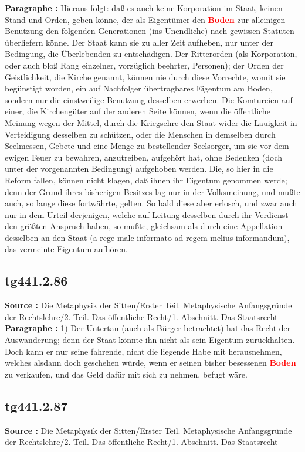 \documentclass[a4paper,12pt,twoside]{book}
\newcommand{\match}[1]{\textcolor{red}{\textbf{#1}}}
\begin{document}
	\textbf{Paragraphe : }Hieraus folgt: daß es auch keine Korporation im Staat, keinen Stand und Orden, geben könne, der als Eigentümer den \match{Boden} zur alleinigen Benutzung den folgenden Generationen (ins Unendliche) nach gewissen Statuten überliefern könne. Der Staat kann sie zu aller Zeit aufheben, nur unter der Bedingung, die Überlebenden zu entschädigen. Der Ritterorden (als Korporation, oder auch bloß Rang einzelner, vorzüglich beehrter, Personen); der Orden der Geistlichkeit, die Kirche genannt, können nie durch diese Vorrechte, womit sie begünstigt worden, ein auf Nachfolger übertragbares Eigentum am Boden, sondern nur die einstweilige Benutzung desselben erwerben. Die Komtureien auf einer, die Kirchengüter auf der anderen Seite können, wenn die öffentliche Meinung wegen der Mittel, durch die Kriegsehre
	den Staat wider die Lauigkeit in Verteidigung desselben zu schützen, oder die Menschen in demselben durch Seelmessen, Gebete und eine Menge zu bestellender Seelsorger, um sie vor dem ewigen Feuer zu bewahren, anzutreiben, aufgehört hat, ohne Bedenken (doch unter der vorgenannten Bedingung) aufgehoben werden. Die, so hier in die Reform fallen, können nicht klagen, daß ihnen ihr Eigentum genommen werde; denn der Grund ihres bisherigen Besitzes lag nur in der Volksmeinung, und mußte auch, so lange diese fortwährte, gelten. So bald diese aber erlosch, und zwar auch nur in dem Urteil derjenigen, welche auf Leitung desselben durch ihr Verdienst den größten Anspruch haben, so mußte, gleichsam als durch eine Appellation desselben an den Staat (a rege male informato ad regem melius informandum), das vermeinte Eigentum aufhören. 
	
	\subsection*{tg441.2.86} 
	\textbf{Source : }Die Metaphysik der Sitten/Erster Teil. Metaphysische Anfangsgründe der Rechtslehre/2. Teil. Das öffentliche Recht/1. Abschnitt. Das Staatsrecht\\  
	
	\textbf{Paragraphe : }1) Der Untertan (auch als Bürger betrachtet) hat das Recht der Auswanderung; denn der Staat könnte ihn nicht als sein Eigentum zurückhalten. Doch kann er nur seine fahrende, nicht die liegende Habe mit herausnehmen, welches alsdann doch geschehen würde, wenn er seinen bisher besessenen \match{Boden} zu verkaufen, und das Geld dafür mit sich zu nehmen, befugt wäre. 
	
	\subsection*{tg441.2.87} 
	\textbf{Source : }Die Metaphysik der Sitten/Erster Teil. Metaphysische Anfangsgründe der Rechtslehre/2. Teil. Das öffentliche Recht/1. Abschnitt. Das Staatsrecht\\  
	
\end{document}
